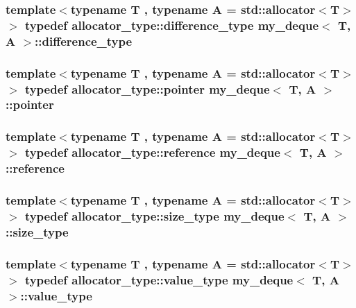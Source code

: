 \hypertarget{classmy__deque_ac85676cb2492fbc9bbc6f1a30e9d3c73}{
\subsubsection[{difference\-\_\-type}]{\setlength{\rightskip}{0pt plus 5cm}template$<$typename T , typename A  = std\-::allocator$<$\-T$>$$>$ typedef allocator\-\_\-type\-::difference\-\_\-type {\bf my\-\_\-deque}$<$ T, A $>$\-::{\bf difference\-\_\-type}}}\label{classmy__deque_ac85676cb2492fbc9bbc6f1a30e9d3c73}
\hypertarget{classmy__deque_a58e82fc365a3b086367479515e1515be}{
\subsubsection[{pointer}]{\setlength{\rightskip}{0pt plus 5cm}template$<$typename T , typename A  = std\-::allocator$<$\-T$>$$>$ typedef allocator\-\_\-type\-::pointer {\bf my\-\_\-deque}$<$ T, A $>$\-::{\bf pointer}}}\label{classmy__deque_a58e82fc365a3b086367479515e1515be}
\hypertarget{classmy__deque_a4c34c14f397b7676445b37c87003116b}{
\subsubsection[{reference}]{\setlength{\rightskip}{0pt plus 5cm}template$<$typename T , typename A  = std\-::allocator$<$\-T$>$$>$ typedef allocator\-\_\-type\-::reference {\bf my\-\_\-deque}$<$ T, A $>$\-::{\bf reference}}}\label{classmy__deque_a4c34c14f397b7676445b37c87003116b}
\hypertarget{classmy__deque_a61e5e5317fe72a381ce4d45f09544b02}{
\subsubsection[{size\-\_\-type}]{\setlength{\rightskip}{0pt plus 5cm}template$<$typename T , typename A  = std\-::allocator$<$\-T$>$$>$ typedef allocator\-\_\-type\-::size\-\_\-type {\bf my\-\_\-deque}$<$ T, A $>$\-::{\bf size\-\_\-type}}}\label{classmy__deque_a61e5e5317fe72a381ce4d45f09544b02}
\hypertarget{classmy__deque_ae9c156c405acc57623a4601ce755596f}{
\subsubsection[{value\-\_\-type}]{\setlength{\rightskip}{0pt plus 5cm}template$<$typename T , typename A  = std\-::allocator$<$\-T$>$$>$ typedef allocator\-\_\-type\-::value\-\_\-type {\bf my\-\_\-deque}$<$ T, A $>$\-::{\bf value\-\_\-type}}}\label{classmy__deque_ae9c156c405acc57623a4601ce755596f}


